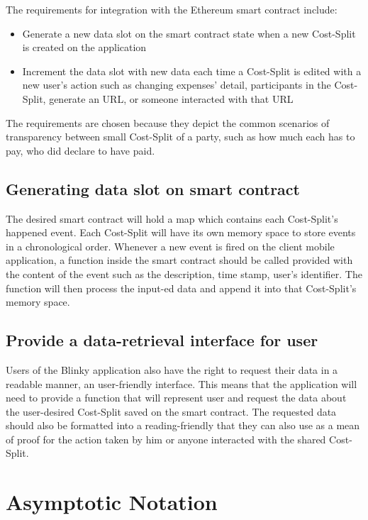 The requirements for integration with the Ethereum smart contract include:

\begin{itemize}
    \item Generate a new data slot on the smart contract state when a new Cost-Split is created on the application
    \item Increment the data slot with new data each time a Cost-Split is edited with a new user's action such as changing expenses' detail, participants in the Cost-Split, generate an URL, or someone interacted with that URL
\end{itemize}

The requirements are chosen because they depict the common scenarios of transparency between small Cost-Split of a party, such as how much each has to pay, who did declare to have paid.

\subsection{Generating data slot on smart contract}

The desired smart contract will hold a map which contains each Cost-Split's happened event. Each Cost-Split will have its own memory space to store events in a chronological order. Whenever a new event is fired on the client mobile application, a function inside the smart contract should be called provided with the content of the event such as the description, time stamp, user's identifier. The function will then process the input-ed data and append it into that Cost-Split's memory space.

\subsection{Provide a data-retrieval interface for user}

Users of the Blinky application also have the right to request their data in a readable manner, an user-friendly interface. This means that the application will need to provide a function that will represent user and request the data about the user-desired Cost-Split saved on the smart contract. The requested data should also be formatted into a reading-friendly that they can also use as a mean of proof for the action taken by him or anyone interacted with the shared Cost-Split.

\section{Asymptotic Notation}

